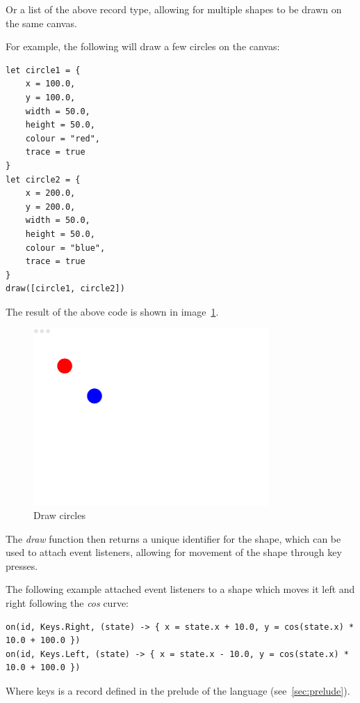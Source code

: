 Or a list of the above record type, allowing for multiple shapes to be drawn on the same canvas.

For example, the following will draw a few circles on the canvas:

\begin{verbatim}
let circle1 = {
    x = 100.0,
    y = 100.0,
    width = 50.0,
    height = 50.0,
    colour = "red",
    trace = true
}
let circle2 = {
    x = 200.0,
    y = 200.0,
    width = 50.0,
    height = 50.0,
    colour = "blue",
    trace = true
}
draw([circle1, circle2])
\end{verbatim}

The result of the above code is shown in image~\ref{fig:draw-circles}.

\begin{figure}[H]
    \centering
    \includegraphics[width=0.8\textwidth]{drawImage}
    \caption{Draw circles}\label{fig:draw-circles}
\end{figure}

The \textit{draw} function then returns a unique identifier for the shape, which can be used to attach event 
listeners, allowing for movement of the shape through key presses.

The following example attached event listeners to a shape which moves it left and right following the \textit{cos} curve:

\begin{verbatim}
on(id, Keys.Right, (state) -> { x = state.x + 10.0, y = cos(state.x) * 10.0 + 100.0 })
on(id, Keys.Left, (state) -> { x = state.x - 10.0, y = cos(state.x) * 10.0 + 100.0 })
\end{verbatim}

Where keys is a record defined in the prelude of the language (see~\autoref{sec:prelude}).

